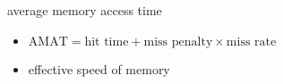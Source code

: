 \begin{frame}{average memory access time}
    \begin{itemize}
    \item $\text{AMAT} = \text{hit time} + \text{miss penalty} \times \text{miss rate}$
    \item effective speed of memory
    \end{itemize}
\end{frame}
